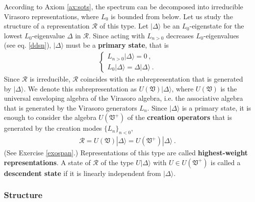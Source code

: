 \documentclass[12pt, a4paper, notitlepage, twoside]{report}
\numberwithin{equation}{section}
\theoremstyle{break}
\begin{document}
According to Axiom \ref{ax:sots}, the spectrum can be decomposed into irreducible Virasoro representations, where $L_0$ is bounded from below. 
Let us study the structure of a representation $\mathcal{R}$ of this type. 
Let $|\Delta\rangle$ be an $L_0$-eigenstate for the lowest $L_0$-eigenvalue $\Delta$ in $\mathcal{R}$.
Since acting with $L_{n>0}$ decreases $L_0$-eigenvalues (see eq. \eqref{ddsn}), $|\Delta\rangle$ must be a \textbf{\boldmath primary state}, that is
\begin{align}
 \boxed{\left\{\begin{array}{l}  L_{n>0}|\Delta\rangle = 0\ , \\ L_0 |\Delta\rangle = \Delta |\Delta\rangle\ .\end{array}\right. }
\label{lvlv}
\end{align}
Since $\mathcal{R}$ is irreducible, $\mathcal{R}$ coincides with the subrepresentation that is generated by $|\Delta\rangle$. We denote this subrepresentation as $U(\mathfrak{V})|\Delta\rangle$, where $U(\mathfrak{V})$ is the universal enveloping algebra of the Virasoro algebra, i.e. the associative algebra that is generated by the Virasoro generators $L_n$.
Since $|\Delta\rangle$ is a primary state, it is enough to consider the algebra $U(\mathfrak{V}^+)$ of the \textbf{\boldmath creation operators} that is generated by the creation modes $\{L_n\}_{n<0}$, 
\begin{align}
 \mathcal{R} = U(\mathfrak{V})|\Delta\rangle =U(\mathfrak{V}^+)|\Delta\rangle\ .
\label{ruv}
\end{align}
(See Exercise \ref{exospan}.)
Representations of this type are called \textbf{\boldmath highest-weight representations}.
A state of $\mathcal{R}$ of the type $U|\Delta\rangle$ with $U\in U(\mathfrak{V}^+)$ is called a \textbf{\boldmath descendent state} if it is linearly independent from $|\Delta\rangle$.


\subsubsection{Structure}
\end{document}
